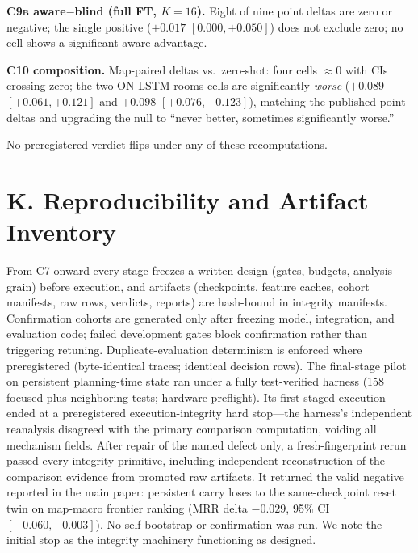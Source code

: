 \documentclass[letterpaper]{article} %
\newcommand{\stage}[1]{\textsc{#1}}
\begin{document}
\textbf{\stage{C9b} aware$-$blind (full FT, $K{=}16$).} Eight of nine point deltas are zero or negative; the single positive ($+0.017$ $[0.000,+0.050]$) does not exclude zero; no cell shows a significant aware advantage.

\textbf{\stage{C10} composition.} Map-paired deltas vs.\ zero-shot: four cells $\approx$0 with CIs crossing zero; the two ON-LSTM rooms cells are significantly \emph{worse} ($+0.089$ $[+0.061,+0.121]$ and $+0.098$ $[+0.076,+0.123]$), matching the published point deltas and upgrading the null to ``never better, sometimes significantly worse.''

No preregistered verdict flips under any of these recomputations.

\section{K. Reproducibility and Artifact Inventory}

From \stage{C7} onward every stage freezes a written design (gates, budgets, analysis grain) before execution, and artifacts (checkpoints, feature caches, cohort manifests, raw rows, verdicts, reports) are hash-bound in integrity manifests. Confirmation cohorts are generated only after freezing model, integration, and evaluation code; failed development gates block confirmation rather than triggering retuning. Duplicate-evaluation determinism is enforced where preregistered (byte-identical traces; identical decision rows). The final-stage pilot on persistent planning-time state ran under a fully test-verified harness (158 focused-plus-neighboring tests; hardware preflight). Its first staged execution ended at a preregistered execution-integrity hard stop---the harness's independent reanalysis disagreed with the primary comparison computation, voiding all mechanism fields. After repair of the named defect only, a fresh-fingerprint rerun passed every integrity primitive, including independent reconstruction of the comparison evidence from promoted raw artifacts. It returned the valid negative reported in the main paper: persistent carry loses to the same-checkpoint reset twin on map-macro frontier ranking (MRR delta $-0.029$, 95\% CI $[-0.060,-0.003]$). No self-bootstrap or confirmation was run. We note the initial stop as the integrity machinery functioning as designed.
\end{document}

